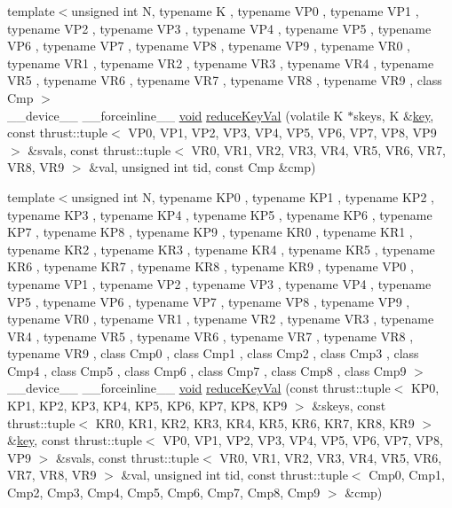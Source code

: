 \begin{DoxyCompactItemize}
\item 
{\footnotesize template$<$unsigned int N, typename K , typename V\-P0 , typename V\-P1 , typename V\-P2 , typename V\-P3 , typename V\-P4 , typename V\-P5 , typename V\-P6 , typename V\-P7 , typename V\-P8 , typename V\-P9 , typename V\-R0 , typename V\-R1 , typename V\-R2 , typename V\-R3 , typename V\-R4 , typename V\-R5 , typename V\-R6 , typename V\-R7 , typename V\-R8 , typename V\-R9 , class Cmp $>$ }\\\-\_\-\-\_\-device\-\_\-\-\_\- \-\_\-\-\_\-forceinline\-\_\-\-\_\- \hyperlink{legacy_8hpp_a8bb47f092d473522721002c86c13b94e}{void} \hyperlink{namespacecv_1_1gpu_1_1device_a7e8932cf6a9bac10d935e860db0539b3}{reduce\-Key\-Val} (volatile K $\ast$skeys, K \&\hyperlink{core__c_8h_a68cf695b604d08c0b6f6f6bb282a6586}{key}, const thrust\-::tuple$<$ V\-P0, V\-P1, V\-P2, V\-P3, V\-P4, V\-P5, V\-P6, V\-P7, V\-P8, V\-P9 $>$ \&svals, const thrust\-::tuple$<$ V\-R0, V\-R1, V\-R2, V\-R3, V\-R4, V\-R5, V\-R6, V\-R7, V\-R8, V\-R9 $>$ \&val, unsigned int tid, const Cmp \&cmp)
\item 
{\footnotesize template$<$unsigned int N, typename K\-P0 , typename K\-P1 , typename K\-P2 , typename K\-P3 , typename K\-P4 , typename K\-P5 , typename K\-P6 , typename K\-P7 , typename K\-P8 , typename K\-P9 , typename K\-R0 , typename K\-R1 , typename K\-R2 , typename K\-R3 , typename K\-R4 , typename K\-R5 , typename K\-R6 , typename K\-R7 , typename K\-R8 , typename K\-R9 , typename V\-P0 , typename V\-P1 , typename V\-P2 , typename V\-P3 , typename V\-P4 , typename V\-P5 , typename V\-P6 , typename V\-P7 , typename V\-P8 , typename V\-P9 , typename V\-R0 , typename V\-R1 , typename V\-R2 , typename V\-R3 , typename V\-R4 , typename V\-R5 , typename V\-R6 , typename V\-R7 , typename V\-R8 , typename V\-R9 , class Cmp0 , class Cmp1 , class Cmp2 , class Cmp3 , class Cmp4 , class Cmp5 , class Cmp6 , class Cmp7 , class Cmp8 , class Cmp9 $>$ }\\\-\_\-\-\_\-device\-\_\-\-\_\- \-\_\-\-\_\-forceinline\-\_\-\-\_\- \hyperlink{legacy_8hpp_a8bb47f092d473522721002c86c13b94e}{void} \hyperlink{namespacecv_1_1gpu_1_1device_a15479095ce7325ba9fb159b60db49b98}{reduce\-Key\-Val} (const thrust\-::tuple$<$ K\-P0, K\-P1, K\-P2, K\-P3, K\-P4, K\-P5, K\-P6, K\-P7, K\-P8, K\-P9 $>$ \&skeys, const thrust\-::tuple$<$ K\-R0, K\-R1, K\-R2, K\-R3, K\-R4, K\-R5, K\-R6, K\-R7, K\-R8, K\-R9 $>$ \&\hyperlink{core__c_8h_a68cf695b604d08c0b6f6f6bb282a6586}{key}, const thrust\-::tuple$<$ V\-P0, V\-P1, V\-P2, V\-P3, V\-P4, V\-P5, V\-P6, V\-P7, V\-P8, V\-P9 $>$ \&svals, const thrust\-::tuple$<$ V\-R0, V\-R1, V\-R2, V\-R3, V\-R4, V\-R5, V\-R6, V\-R7, V\-R8, V\-R9 $>$ \&val, unsigned int tid, const thrust\-::tuple$<$ Cmp0, Cmp1, Cmp2, Cmp3, Cmp4, Cmp5, Cmp6, Cmp7, Cmp8, Cmp9 $>$ \&cmp)

\end{DoxyCompactItemize}
